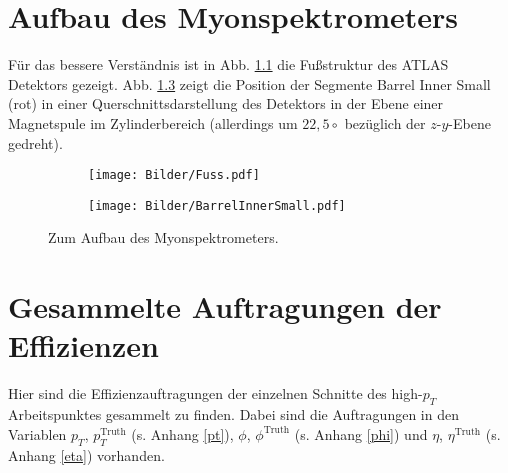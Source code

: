 \chapter{Aufbau des Myonspektrometers}
Für das bessere Verständnis ist in Abb. \ref{Fuss} die Fußstruktur des ATLAS Detektors gezeigt.
Abb. \ref{BarrelInnerSmall} zeigt die Position der Segmente Barrel Inner Small (rot) in einer Querschnittsdarstellung des Detektors in der Ebene einer Magnetspule im Zylinderbereich (allerdings um $22,5\circ$ bezüglich der $z$-$y$-Ebene gedreht).
\begin{figure}
\centering
  \begin{subfigure}[t]{0.8\textwidth}
  \texttt{[image: Bilder/Fuss.pdf]}
  \label{Fuss}
  \end{subfigure}
\begin{subfigure}[t]{0.8\textwidth}
\centering
 \texttt{[image: Bilder/BarrelInnerSmall.pdf]}
  \label{BarrelInnerSmall}
\end{subfigure}
\caption{Zum Aufbau des Myonspektrometers.}
\end{figure}
\chapter{Gesammelte Auftragungen der Effizienzen}\label{AnhangEff}
Hier sind die Effizienzauftragungen der einzelnen Schnitte des high-$p_T$ Ar\-beits\-punktes gesammelt zu finden. Dabei sind die Auftragungen in den Variablen $p_T$, $p_T^{\text{Truth}}$ (s. Anhang \ref{pt}), $\phi$, $\phi^{\text{Truth}}$ (s. Anhang \ref{phi}) und $\eta$, $\eta^{\text{Truth}}$ (s. Anhang \ref{eta}) vorhanden. 
